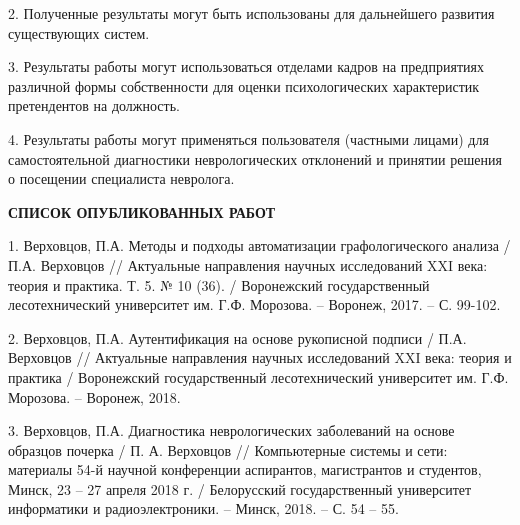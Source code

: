 2. Полученные результаты могут быть использованы для дальнейшего развития существующих систем.

3. Результаты работы могут использоваться отделами кадров на предприятиях различной формы собственности для оценки психологических характеристик претендентов на должность.

4. Результаты работы могут применяться пользователя (частными лицами) для самостоятельной диагностики неврологических отклонений и принятии решения о посещении специалиста невролога.

\clearpage

\begin{center}
{\bfseries СПИСОК ОПУБЛИКОВАННЫХ РАБОТ}
\end{center}

1. Верховцов, П.А. Методы и подходы автоматизации графологического анализа / П.А. Верховцов // Актуальные направления научных исследований XXI века: теория и практика. Т. 5. № 10 (36). / Воронежский государственный лесотехнический университет им. Г.Ф. Морозова. – Воронеж, 2017. – С. 99-102.

2. Верховцов, П.А. Аутентификация на основе рукописной подписи / П.А. Верховцов // Актуальные направления научных исследований XXI века: теория и практика / Воронежский государственный лесотехнический университет им. Г.Ф. Морозова. – Воронеж, 2018.

3. Верховцов, П.А. Диагностика неврологических заболеваний на основе образцов почерка / П. А. Верховцов // Компьютерные системы и сети: материалы 54-й научной конференции аспирантов, магистрантов и студентов, Минск, 23 – 27 апреля 2018 г. / Белорусский государственный университет информатики и радиоэлектроники. – Минск, 2018. – С. 54 – 55.

\clearpage